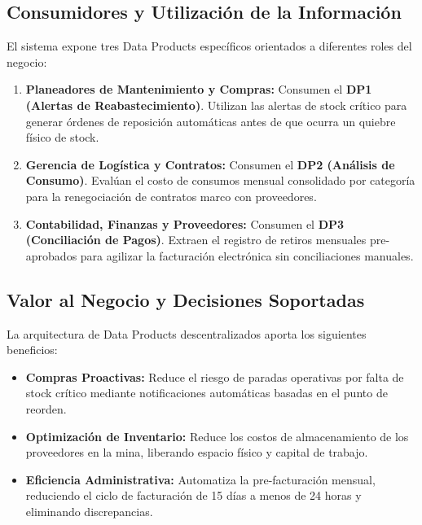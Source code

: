 \documentclass[11pt,a4paper]{article}
\begin{document}
\subsection{Consumidores y Utilización de la Información}
El sistema expone tres Data Products específicos orientados a diferentes roles del negocio:
\begin{enumerate}
    \item \textbf{Planeadores de Mantenimiento y Compras:} Consumen el \textbf{DP1 (Alertas de Reabastecimiento)}. Utilizan las alertas de stock crítico para generar órdenes de reposición automáticas antes de que ocurra un quiebre físico de stock.
    \item \textbf{Gerencia de Logística y Contratos:} Consumen el \textbf{DP2 (Análisis de Consumo)}. Evalúan el costo de consumos mensual consolidado por categoría para la renegociación de contratos marco con proveedores.
    \item \textbf{Contabilidad, Finanzas y Proveedores:} Consumen el \textbf{DP3 (Conciliación de Pagos)}. Extraen el registro de retiros mensuales pre-aprobados para agilizar la facturación electrónica sin conciliaciones manuales.
\end{enumerate}

\subsection{Valor al Negocio y Decisiones Soportadas}
La arquitectura de Data Products descentralizados aporta los siguientes beneficios:
\begin{itemize}
    \item \textbf{Compras Proactivas:} Reduce el riesgo de paradas operativas por falta de stock crítico mediante notificaciones automáticas basadas en el punto de reorden.
    \item \textbf{Optimización de Inventario:} Reduce los costos de almacenamiento de los proveedores en la mina, liberando espacio físico y capital de trabajo.
    \item \textbf{Eficiencia Administrativa:} Automatiza la pre-facturación mensual, reduciendo el ciclo de facturación de 15 días a menos de 24 horas y eliminando discrepancias.
\end{itemize}
\end{document}
